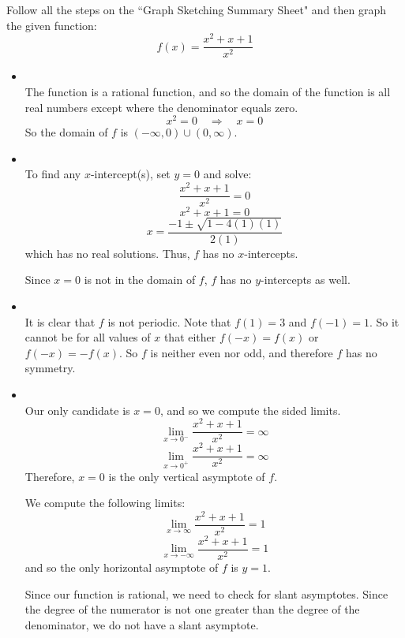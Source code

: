\documentclass[handout,nooutcomes]{ximera}
\begin{document}
\begin{problem}
Follow all the steps on the ``Graph Sketching Summary Sheet" and then graph the given function:
$$ f(x) = \frac{x^2 + x + 1}{x^2} $$

		\begin{freeResponse}  

		\begin{itemize}
		
			\item  {}  \\
			The function is a rational function, and so the domain of the function is all real numbers except where the denominator equals zero.
			$$ x^2 = 0 \quad \Longrightarrow \quad x=0 $$
			So the domain of $f$ is $(-\infty ,0)\cup (0,\infty )$.
			
			
			
			\item  {}  \\
			To find any $x$-intercept(s), set $y=0$ and solve:
			$$ \frac{x^2 + x + 1}{x^2} = 0 $$
			$$ x^2 + x + 1 = 0 $$
			$$ x = \frac{-1 \pm \sqrt{1-4(1)(1)}}{2(1)} $$
			which has no real solutions.  Thus, $f$ has no $x$-intercepts.
			
			Since $x=0$ is not in the domain of $f$, $f$ has no $y$-intercepts as well.
			
			
			
			\item  {}  \\
			
			It is clear that $f$ is not periodic.  Note that $f(1) = 3$ and $f(-1) = 1$.  So it cannot be for all values of $x$ that either $f(-x) = f(x)$ or $f(-x) = -f(x)$.  So $f$ is neither even nor odd, and therefore $f$ has no symmetry.
			
			\item  {}  \\
			  Our only candidate is $x=0$, and so we compute the sided limits.
			$$ \lim_{x \to 0^-} \frac{x^2+x+1}{x^2} = \infty $$
			$$ \lim_{x \to 0^+} \frac{x^2+x+1}{x^2} = \infty $$
			Therefore, $x=0$ is the only vertical asymptote of $f$.
			
			  We compute the following limits:
			$$ \lim_{x \to \infty} \frac{x^2+x+1}{x^2} = 1 $$
			$$ \lim_{x \to -\infty} \frac{x^2+x+1}{x^2} = 1 $$
			and so the only horizontal asymptote of $f$ is $y=1$.
			
			  Since our function is rational, we need to check for slant asymptotes.  Since the degree of the numerator is not one greater than the degree of the denominator, we do not have a slant asymptote.
			

\end{itemize}
\end{freeResponse}
\end{problem}
\end{document}
